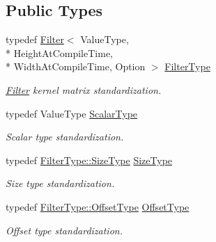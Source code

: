\subsection*{Public Types}
\begin{DoxyCompactItemize}
\item 
typedef \hyperlink{structffnn_1_1layer_1_1internal_1_1_filter}{Filter}$<$ Value\-Type, \\*
Height\-At\-Compile\-Time, \\*
Width\-At\-Compile\-Time, Option $>$ \hyperlink{structffnn_1_1layer_1_1internal_1_1_filter_bank_a3d0c31e34015b7afdd1ee4e34f3344b8}{Filter\-Type}
\begin{DoxyCompactList}\small\item\em \hyperlink{structffnn_1_1layer_1_1internal_1_1_filter}{Filter} kernel matrix standardization. \end{DoxyCompactList}\item 
typedef Value\-Type \hyperlink{structffnn_1_1layer_1_1internal_1_1_filter_bank_ab182aa55b8688535027636e0a916bcbc}{Scalar\-Type}
\begin{DoxyCompactList}\small\item\em Scalar type standardization. \end{DoxyCompactList}\item 
typedef \hyperlink{structffnn_1_1layer_1_1internal_1_1_filter_adaf4459cd0d17e558b5f5f4773bacf97}{Filter\-Type\-::\-Size\-Type} \hyperlink{structffnn_1_1layer_1_1internal_1_1_filter_bank_af9efd4275b52c4222e82cfa9f6514ebb}{Size\-Type}
\begin{DoxyCompactList}\small\item\em Size type standardization. \end{DoxyCompactList}\item 
typedef \hyperlink{structffnn_1_1layer_1_1internal_1_1_filter_a543008f199d45ea3c353751c78489a4b}{Filter\-Type\-::\-Offset\-Type} \hyperlink{structffnn_1_1layer_1_1internal_1_1_filter_bank_ae6ffb0468f8f6acbfe37505d00935a00}{Offset\-Type}
\begin{DoxyCompactList}\small\item\em Offset type standardization. \end{DoxyCompactList}\end{DoxyCompactItemize}
